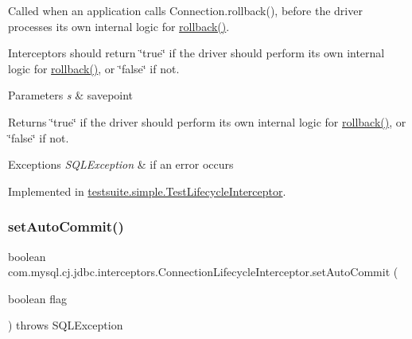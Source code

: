 Called when an application calls Connection.\+rollback(), before the driver processes its own internal logic for \mbox{\hyperlink{interfacecom_1_1mysql_1_1cj_1_1jdbc_1_1interceptors_1_1_connection_lifecycle_interceptor_a0659ae7aff8c74e8236b82deccee4fed}{rollback()}}.

Interceptors should return \char`\"{}true\char`\"{} if the driver should perform its own internal logic for \mbox{\hyperlink{interfacecom_1_1mysql_1_1cj_1_1jdbc_1_1interceptors_1_1_connection_lifecycle_interceptor_a0659ae7aff8c74e8236b82deccee4fed}{rollback()}}, or \char`\"{}false\char`\"{} if not.


\begin{DoxyParams}{Parameters}
{\em s} & savepoint \\
\hline
\end{DoxyParams}
\begin{DoxyReturn}{Returns}
\char`\"{}true\char`\"{} if the driver should perform its own internal logic for \mbox{\hyperlink{interfacecom_1_1mysql_1_1cj_1_1jdbc_1_1interceptors_1_1_connection_lifecycle_interceptor_a0659ae7aff8c74e8236b82deccee4fed}{rollback()}}, or \char`\"{}false\char`\"{} if not.
\end{DoxyReturn}

\begin{DoxyExceptions}{Exceptions}
{\em S\+Q\+L\+Exception} & if an error occurs \\
\hline
\end{DoxyExceptions}


Implemented in \mbox{\hyperlink{classtestsuite_1_1simple_1_1_test_lifecycle_interceptor_a75e431938104c0c3b8e1913b81ced992}{testsuite.\+simple.\+Test\+Lifecycle\+Interceptor}}.

\mbox{\label{interfacecom_1_1mysql_1_1cj_1_1jdbc_1_1interceptors_1_1_connection_lifecycle_interceptor_a59c4f11d95ed73bad5c35c6741c03197}} 
\subsubsection{\texorpdfstring{set\+Auto\+Commit()}{setAutoCommit()}}
{\footnotesize\ttfamily boolean com.\+mysql.\+cj.\+jdbc.\+interceptors.\+Connection\+Lifecycle\+Interceptor.\+set\+Auto\+Commit (\begin{DoxyParamCaption}\item[{boolean}]{flag }\end{DoxyParamCaption}) throws S\+Q\+L\+Exception}

